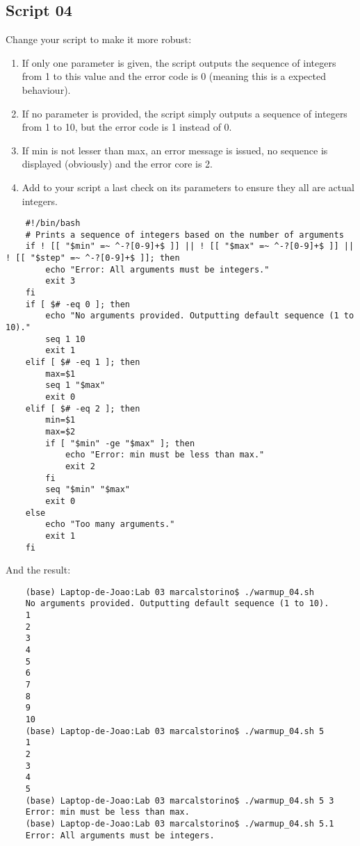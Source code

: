 \documentclass[a4paper, 12pt]{article}
\begin{document}
\subsection{Script 04}
Change your script to make it more robust:
\begin{enumerate}[label=\alph*.]
    \item If only one parameter is given, the script outputs the sequence of integers from 1 to this value and the error code is 0 (meaning this is a expected behaviour).
    \item If no parameter is provided, the script simply outputs a sequence of integers from 1 to 10, but the error code is 1 instead of 0.
    \item If min is not lesser than max, an error message is issued, no sequence is displayed (obviously) and the error core is 2.
    \item Add to your script a last check on its parameters to ensure they all are actual integers.
\end{enumerate}

\begin{lstlisting}
    #!/bin/bash
    # Prints a sequence of integers based on the number of arguments
    if ! [[ "$min" =~ ^-?[0-9]+$ ]] || ! [[ "$max" =~ ^-?[0-9]+$ ]] || ! [[ "$step" =~ ^-?[0-9]+$ ]]; then
        echo "Error: All arguments must be integers."
        exit 3
    fi
    if [ $# -eq 0 ]; then
        echo "No arguments provided. Outputting default sequence (1 to 10)."
        seq 1 10
        exit 1
    elif [ $# -eq 1 ]; then
        max=$1
        seq 1 "$max"
        exit 0
    elif [ $# -eq 2 ]; then
        min=$1
        max=$2
        if [ "$min" -ge "$max" ]; then
            echo "Error: min must be less than max."
            exit 2
        fi
        seq "$min" "$max"
        exit 0
    else
        echo "Too many arguments."
        exit 1
    fi
\end{lstlisting}

And the result:

\begin{lstlisting}
    (base) Laptop-de-Joao:Lab 03 marcalstorino$ ./warmup_04.sh 
    No arguments provided. Outputting default sequence (1 to 10).
    1
    2
    3
    4
    5
    6
    7
    8
    9
    10
    (base) Laptop-de-Joao:Lab 03 marcalstorino$ ./warmup_04.sh 5
    1
    2
    3
    4
    5
    (base) Laptop-de-Joao:Lab 03 marcalstorino$ ./warmup_04.sh 5 3
    Error: min must be less than max.
    (base) Laptop-de-Joao:Lab 03 marcalstorino$ ./warmup_04.sh 5.1
    Error: All arguments must be integers.
\end{lstlisting}
\end{document}
